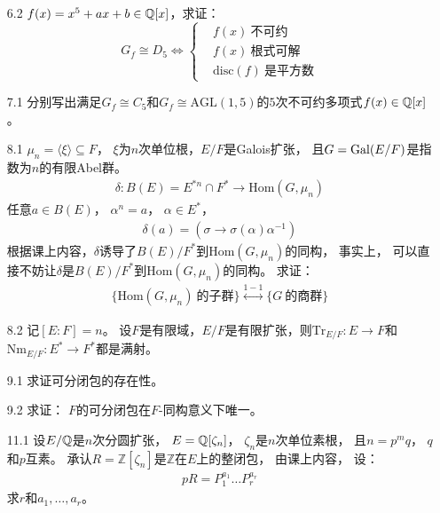 \begin{itemize}
    \item[6.2]$f(x)=x^5+ax+b \in \mathbb{Q}[x]$，求证：
        $$
        G_f \cong D_5
        \Longleftrightarrow
        \left\{
        \begin{aligned}
        	&f(x)\ 不可约 \\
        	&f(x)\ 根式可解 \\
        	&\mathrm{disc}(f)\ 是平方数
        \end{aligned}
        \right.
        $$

    \item[7.1]
    分别写出满足$G_f\cong C_5$和$G_f\cong \mathrm{AGL}(1,5)$的$5$次不可约多项式$f(x)\in \mathbb{Q}[x]$。

    \item[8.1]
    $\mu_n=\langle\xi\rangle\subseteq F$，
		$\xi$为$n$次单位根，$E/F$是Galois扩张，
		且$G = \operatorname{Gal}(E/F)$是指数为$n$的有限Abel群。
		\begin{align*}
			\delta : B(E)=E^{*n}\cap F^* \longrightarrow \mathrm{Hom}(G,\mu_n)
		\end{align*}
		任意$a\in B(E)$，
		$\alpha^n = a$，
		$\alpha \in E^*$，
		\begin{align*}
			\delta(a)=(\sigma \to \sigma(\alpha)\alpha^{-1})
		\end{align*}
		根据课上内容，$\delta$诱导了$B(E)/F^*$到$\mathrm{Hom}(G,\mu_n)$的同构，
		事实上，
		可以直接不妨让$\delta$是$B(E)/F^*$到$\mathrm{Hom}(G,\mu_n)$的同构。
		求证：
		\begin{align*}
			\bigl\{
			\mathrm{Hom}(G,\mu_n)\ 的子群
			\bigr\}
			\stackrel{1-1}{\longleftrightarrow}
			\bigl\{
			G\ 的商群
			\bigr\}
		\end{align*}
    
    \item[8.2]
    记$[E:F]=n$。
		设$F$是有限域，$E/F$是有限扩张，则$\mathrm{Tr}_{E/F}:E\to F$和$\mathrm{Nm}_{E/F}:E^*\to F^*$都是满射。
    
    \item[9.1]
    求证可分闭包的存在性。

    \item[9.2]求证：
		$F$的可分闭包在$F$-同构意义下唯一。
    
    \item[11.1]
    设$E/\mathbb{Q}$是$n$次分圆扩张，
		$E=\mathbb{Q}[\zeta_n]$，
		$\zeta_n$是$n$次单位素根，
		且$n=p^mq$，
		$q$和$p$互素。
		承认$R=\mathbb{Z}[\zeta_n]$是$\mathbb{Z}$在$E$上的整闭包，
		由课上内容，
		设：
		\begin{align*}
			pR=P_1^{a_1}\ldots P_r^{a_r}
		\end{align*}
		求$r$和$a_1,\ldots,a_r$。


\end{itemize}
